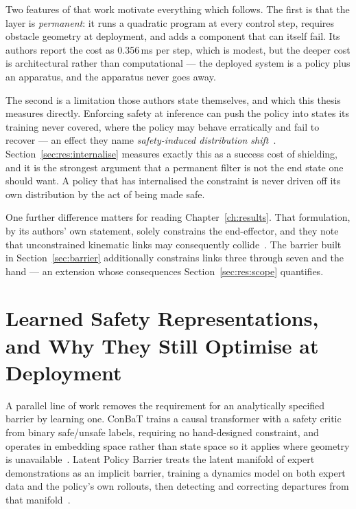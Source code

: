 \documentclass[a4paper,11pt]{report}
\begin{document}
Two features of that work motivate everything which follows. The first is that the layer is
\emph{permanent}: it runs a quadratic program at every control step, requires obstacle geometry at
deployment, and adds a component that can itself fail. Its authors report the cost as 0.356\,ms per
step, which is modest, but the deeper cost is architectural rather than computational --- the
deployed system is a policy plus an apparatus, and the apparatus never goes away.

The second is a limitation those authors state themselves, and which this thesis measures directly.
Enforcing safety at inference can push the policy into states its training never covered, where the
policy may behave erratically and fail to recover --- an effect they name \emph{safety-induced
distribution shift}~\cite{vlsa2026}. Section~\ref{sec:res:internalise} measures exactly this as a
success cost of shielding, and it is the strongest argument that a permanent filter is not the end
state one should want. A policy that has internalised the constraint is never driven off its own
distribution by the act of being made safe.

One further difference matters for reading Chapter~\ref{ch:results}. That formulation, by its
authors' own statement, solely constrains the end-effector, and they note that unconstrained
kinematic links may consequently collide~\cite{vlsa2026}. The barrier built in
Section~\ref{sec:barrier} additionally constrains links three through seven and the hand --- an
extension whose consequences Section~\ref{sec:res:scope} quantifies.

\section{Learned Safety Representations, and Why They Still Optimise at Deployment}
\label{sec:bg:learned}

A parallel line of work removes the requirement for an analytically specified barrier by learning
one. ConBaT trains a causal transformer with a safety critic from binary safe/unsafe labels,
requiring no hand-designed constraint, and operates in embedding space rather than state space so
it applies where geometry is unavailable~\cite{meng2024conbat}. Latent Policy Barrier treats the
latent manifold of expert demonstrations as an implicit barrier, training a dynamics model on both
expert data and the policy's own rollouts, then detecting and correcting departures from that
manifold~\cite{sun2025lpb}.
\end{document}
